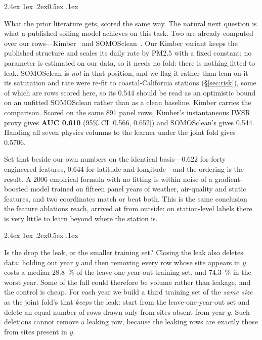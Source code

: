\documentclass[10pt,twocolumn]{article}
\makeatletter
\renewcommand\paragraph{\@startsection{paragraph}{4}{\z@}%
  {2.4ex \@plus1ex \@minus.2ex}{0.5ex \@plus .1ex}%
  {\normalfont\normalsize\bfseries\raggedright}}
\makeatother
\begin{document}
\paragraph{What the prior literature gets, scored the same way.}
The natural next question is what a published soiling model achieves on this task. Two are
already computed over our rows---Kimber~\cite{kimber2006} and
SOMOSclean~\cite{redondo2023somosclean}. Our Kimber variant keeps the published structure and scales its
daily rate by PM2.5 with a fixed constant; no parameter is estimated on our data, so it needs no fold: there is nothing fitted to leak. SOMOSclean is
\emph{not} in that position, and we flag it rather than lean on it---its saturation and
rate were re-fit to coastal-California stations (\S\ref{sec:risk}), some of which are rows
scored here, so its 0.544 should be read as an optimistic bound on an unfitted SOMOSclean
rather than as a clean baseline. Kimber carries the comparison. Scored on the same 891 panel rows,
Kimber's instantaneous IWSR proxy gives \textbf{AUC 0.610} (95\% CI [0.566, 0.652]) and
SOMOSclean's gives 0.544. Handing all seven physics columns to the learner under the joint
fold gives 0.5706.

Set that beside our own numbers on the identical basis---0.622 for forty engineered
features, 0.644 for latitude and longitude---and the ordering is the result. A 2006
empirical formula with no fitting is within noise of a gradient-boosted model trained on
fifteen panel years of weather, air-quality and static features, and two coordinates match
or beat both. This is
the same conclusion the feature ablations reach, arrived at from outside: on
station-level labels there is very little to learn beyond where the station is.

\paragraph{Is the drop the leak, or the smaller training set?}
Closing the leak also deletes data: holding out year $y$ and then removing every row whose
site appears in $y$ costs a median \SI{28.8}{\percent} of the leave-one-year-out training
set, and \SI{74.3}{\percent} in the worst year. Some of the fall could therefore be volume
rather than leakage, and the control is cheap. For each year we build a third training set
of the \emph{same size} as the joint fold's that \emph{keeps} the leak: start from the
leave-one-year-out set and delete an equal number of rows drawn only from sites absent from
year $y$. Such deletions cannot remove a leaking row, because the leaking rows are exactly
those from sites present in $y$.
\end{document}
